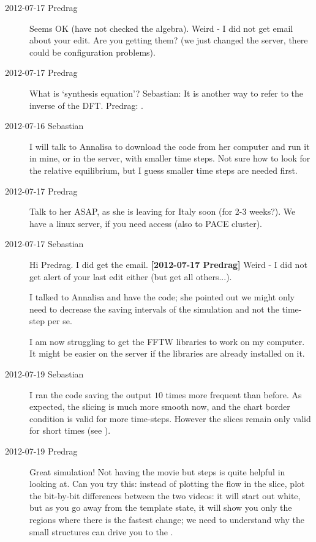 \begin{description}
\item[2012-07-17 Predrag]
Seems OK (have not checked the algebra). Weird - I did not get email
about your edit. Are you getting them? (we just changed the server, there
could be configuration problems).

\item[2012-07-17 Predrag]
What is `synthesis equation'? Sebastian: It is another way to refer to the inverse of the DFT.
Predrag:
.


\item[2012-07-16 Sebastian]
I will talk to Annalisa to download the code from her computer and run it
in mine, or in the server, with smaller time steps. Not sure how to look
for the relative equilibrium, but I guess smaller time steps are needed
first.

\item[2012-07-17 Predrag]
Talk to her ASAP, as she is leaving for Italy soon (for 2-3 weeks?).
We have a linux server, if you need access (also to PACE cluster).

\item[2012-07-17 Sebastian]
Hi Predrag. I did get the email. {\bf [2012-07-17 Predrag]} Weird - I did
not get alert of your last edit either (but get all others...).

I talked to Annalisa and have the code; she pointed out we might only
need to decrease the saving intervals of the simulation and not the
time-step per se.

I am now struggling to get the FFTW libraries to work on my computer. It
might be easier on the server if the libraries are already installed on
it.

\item[2012-07-19 Sebastian]
I ran the code saving the output $10$ times more frequent than before. As
expected, the slicing is much more smooth now, and the chart border
condition is valid for more time-steps. However the slices remain only
valid for short times (see ).

\item[2012-07-19 Predrag] Great simulation! Not having the movie but steps
is quite helpful in looking at. Can you try this: instead of plotting
the flow in the slice, plot the bit-by-bit differences between the two videos:
it will start out white, but as you go away from the template state, it will
show you only the regions where there is the fastest change; we need to understand why
the small structures can drive you to the \chartBord.


\end{description}
